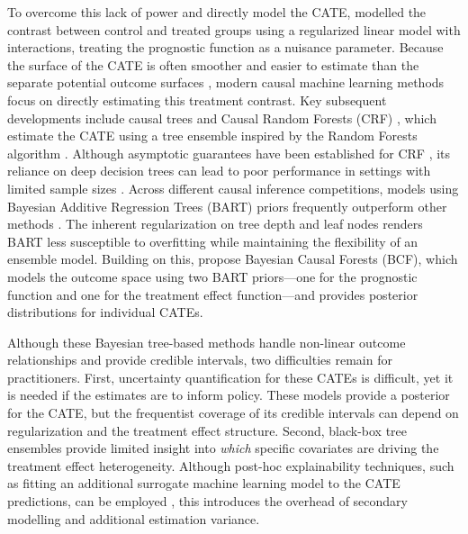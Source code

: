 \documentclass[12pt]{article}
\begin{document}
To overcome this lack of power and directly model the CATE, \cite{tian2014simple} modelled the contrast between control and treated groups using a regularized linear model with interactions, treating the prognostic function as a nuisance parameter. Because the surface of the CATE is often smoother and easier to estimate than the separate potential outcome surfaces \citep{curth2021inductive}, modern causal machine learning methods focus on directly estimating this treatment contrast. Key subsequent developments include causal trees \citep{athey2016recursive} and Causal Random Forests (CRF) \citep{wager2018estimation}, which estimate the CATE using a tree ensemble inspired by the Random Forests algorithm \citep{breiman2001random}. Although asymptotic guarantees have been established for CRF \citep{wager2018estimation}, its reliance on deep decision trees can lead to poor performance in settings with limited sample sizes \citep{hahn2020bayesian}. Across different causal inference competitions, models using Bayesian Additive Regression Trees (BART) \citep{chipman2010bart} priors frequently outperform other methods \citep{dorie2019automated}. The inherent regularization on tree depth and leaf nodes renders BART less susceptible to overfitting while maintaining the flexibility of an ensemble model. Building on this, \cite{hahn2020bayesian} propose Bayesian Causal Forests (BCF), which models the outcome space using two BART priors---one for the prognostic function and one for the treatment effect function---and provides posterior distributions for individual CATEs.

Although these Bayesian tree-based methods handle non-linear outcome relationships and provide credible intervals, two difficulties remain for practitioners. First, uncertainty quantification for these CATEs is difficult, yet it is needed if the estimates are to inform policy. These models provide a posterior for the CATE, but the frequentist coverage of its credible intervals can depend on regularization and the treatment effect structure. Second, black-box tree ensembles provide limited insight into \emph{which} specific covariates are driving the treatment effect heterogeneity. Although post-hoc explainability techniques, such as fitting an additional surrogate machine learning model to the CATE predictions, can be employed \citep{svensson2026overview}, this introduces the overhead of secondary modelling and additional estimation variance.
\end{document}

